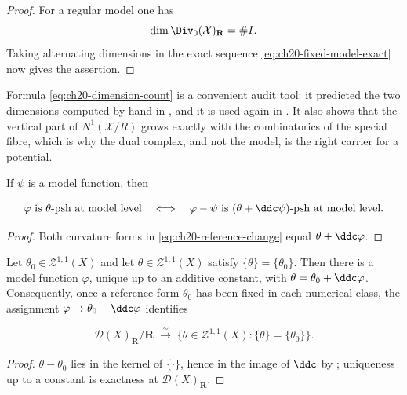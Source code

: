 \begin{proof}
For a regular model one has
\[
 \dim\Div_0(\mathcal X)_{\mathbf R}=\#I.
\]
Taking alternating dimensions in the exact sequence
\eqref{eq:ch20-fixed-model-exact} now gives the assertion.
\end{proof}

Formula \eqref{eq:ch20-dimension-count} is a convenient audit tool: it
predicted the two dimensions computed by hand in
, and it is used again in
.  It also shows that the vertical part of
$N^1(\mathcal X/R)$ grows exactly with the combinatorics of the special
fibre, which is why the dual complex, and not the model, is the right
carrier for a potential.

\begin{corollary}\label{cor:ch20-reference-change}
If $\psi$ is a model function, then

\begin{equation}
\label{eq:ch20-reference-change}
 \varphi\text{ is $\theta$-psh at model level}
 \quad\Longleftrightarrow\quad
 \varphi-\psi\text{ is $(\theta+\ddc\psi)$-psh at model level}.
\end{equation}
\end{corollary}

\begin{proof}
Both curvature forms in \eqref{eq:ch20-reference-change} equal
$\theta+\ddc\varphi$.
\end{proof}

\begin{corollary}
\label{cor:ch20-normal-form}
Let $\theta_0\in\mathcal Z^{1,1}(X)$ and let
$\theta\in\mathcal Z^{1,1}(X)$ satisfy $\{\theta\}=\{\theta_0\}$.  Then
there is a model function $\varphi$, unique up to an additive constant,
with $\theta=\theta_0+\ddc\varphi$.  Consequently, once a reference form
$\theta_0$ has been fixed in each numerical class, the assignment
$\varphi\mapsto\theta_0+\ddc\varphi$ identifies

\[
 \mathcal D(X)_{\mathbf R}/\mathbf R
 \;\xrightarrow{\ \sim\ }\;
 \{\theta\in\mathcal Z^{1,1}(X):\{\theta\}=\{\theta_0\}\}.
\]
\end{corollary}

\begin{proof}
$\theta-\theta_0$ lies in the kernel of $\{\cdot\}$, hence in the image
of $\ddc$ by ; uniqueness up to a constant is
exactness at $\mathcal D(X)_{\mathbf R}$.
\end{proof}

